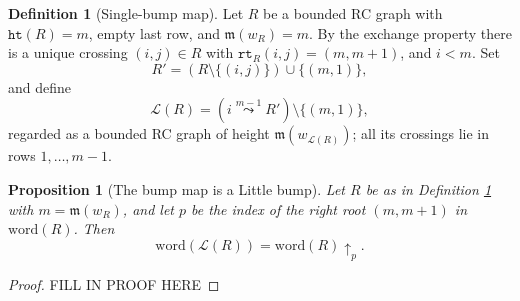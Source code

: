 \documentclass{amsart}
\newtheorem{proposition}[lemma]{Proposition}
\theoremstyle{definition}
\newtheorem{definition}[lemma]{Definition}
\theoremstyle{remark}
\numberwithin{equation}{subsection}
\newcommand{\wof}[1]{w_{#1}}
\newcommand{\rtt}{\mathtt{rt}}
\newcommand{\hr}{\mathtt{ht}}
\newcommand{\lmap}{\mathscr{L}}
\newcommand{\ltb}[2]{#1\!\uparrow_{#2}}
\newcommand{\xleadsto}[2][]{\overset{#2}{\leadsto}}
\newcommand{\ins}[2]{{#2\xleadsto{#1}}}
\newcommand{\maxd}{\mathfrak{m}}
\begin{document}
\begin{definition}[Single-bump map]\label{definition:lmap}
Let $R$ be a bounded RC graph with $\hr(R)=m$, empty last row, and $\maxd(\wof R)=m$. By the exchange property there is a unique crossing $(i,j)\in R$ with $\rtt_R(i,j)=(m,m+1)$, and $i<m$. Set
$$R'=(R\setminus\{(i,j)\})\cup\{(m,1)\},$$
and define
$$\lmap(R)=(\ins{m-1}{i}R')\setminus\{(m,1)\},$$
regarded as a bounded RC graph of height $\maxd(\wof{\lmap(R)})$; all its crossings lie in rows $1,\ldots,m-1$.
\end{definition}

\begin{proposition}[The bump map is a Little bump]\label{proposition:little_bump}
Let $R$ be as in Definition \ref{definition:lmap} with $m=\maxd(\wof R)$, and let $p$ be the index of the right root $(m, m+1)$ in $\mathrm{word}(R)$. Then
$$\mathrm{word}(\lmap(R))=\ltb{\mathrm{word}(R)}{p}.$$
\end{proposition}
\begin{proof}
FILL IN PROOF HERE
\end{proof}



\end{document}
